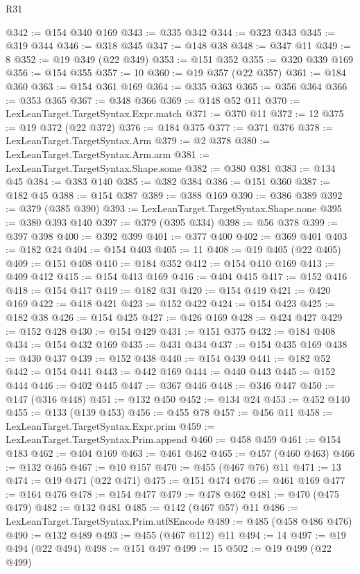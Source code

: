 \begin{lexlean}{R31}
\begin{coremodule}
@342 := @154 @340 @169
@343 := @335 @342
@344 := @323 @343
@345 := @319 @344
@346 := @318 @345
@347 := @148 @38
@348 := @347 @11
@349 := 8
@352 := @19 @349 (@22 @349)
@353 := @151 @352
@355 := @320 @339 @169
@356 := @154 @355
@357 := 10
@360 := @19 @357 (@22 @357)
@361 := @184 @360
@363 := @154 @361 @169
@364 := @335 @363
@365 := @356 @364
@366 := @353 @365
@367 := @348 @366
@369 := @148 @52 @11
@370 := LexLeanTarget.TargetSyntax.Expr.match
@371 := @370 @11
@372 := 12
@375 := @19 @372 (@22 @372)
@376 := @184 @375
@377 := @371 @376
@378 := LexLeanTarget.TargetSyntax.Arm
@379 := @2 @378
@380 := LexLeanTarget.TargetSyntax.Arm.arm
@381 := LexLeanTarget.TargetSyntax.Shape.some
@382 := @380 @381
@383 := @134 @45
@384 := @383 @140
@385 := @382 @384
@386 := @151 @360
@387 := @182 @45
@388 := @154 @387
@389 := @388 @169
@390 := @386 @389
@392 := @379 (@385 @390)
@393 := LexLeanTarget.TargetSyntax.Shape.none
@395 := @380 @393 @140
@397 := @379 (@395 @334)
@398 := @56 @378
@399 := @397 @398
@400 := @392 @399
@401 := @377 @400
@402 := @369 @401
@403 := @182 @24
@404 := @154 @403
@405 := 11
@408 := @19 @405 (@22 @405)
@409 := @151 @408
@410 := @184 @352
@412 := @154 @410 @169
@413 := @409 @412
@415 := @154 @413 @169
@416 := @404 @415
@417 := @152 @416
@418 := @154 @417
@419 := @182 @31
@420 := @154 @419
@421 := @420 @169
@422 := @418 @421
@423 := @152 @422
@424 := @154 @423
@425 := @182 @38
@426 := @154 @425
@427 := @426 @169
@428 := @424 @427
@429 := @152 @428
@430 := @154 @429
@431 := @151 @375
@432 := @184 @408
@434 := @154 @432 @169
@435 := @431 @434
@437 := @154 @435 @169
@438 := @430 @437
@439 := @152 @438
@440 := @154 @439
@441 := @182 @52
@442 := @154 @441
@443 := @442 @169
@444 := @440 @443
@445 := @152 @444
@446 := @402 @445
@447 := @367 @446
@448 := @346 @447
@450 := @147 (@316 @448)
@451 := @132 @450
@452 := @134 @24
@453 := @452 @140
@455 := @133 (@139 @453)
@456 := @455 @78
@457 := @456 @11
@458 := LexLeanTarget.TargetSyntax.Expr.prim
@459 := LexLeanTarget.TargetSyntax.Prim.append
@460 := @458 @459
@461 := @154 @183
@462 := @404 @169
@463 := @461 @462
@465 := @457 (@460 @463)
@466 := @132 @465
@467 := @10 @157
@470 := @455 (@467 @76) @11
@471 := 13
@474 := @19 @471 (@22 @471)
@475 := @151 @474
@476 := @461 @169
@477 := @164 @476
@478 := @154 @477
@479 := @478 @462
@481 := @470 (@475 @479)
@482 := @132 @481
@485 := @142 (@467 @57) @11
@486 := LexLeanTarget.TargetSyntax.Prim.utf8Encode
@489 := @485 (@458 @486 @476)
@490 := @132 @489
@493 := @455 (@467 @112) @11
@494 := 14
@497 := @19 @494 (@22 @494)
@498 := @151 @497
@499 := 15
@502 := @19 @499 (@22 @499)

\end{coremodule}
\end{lexlean}
